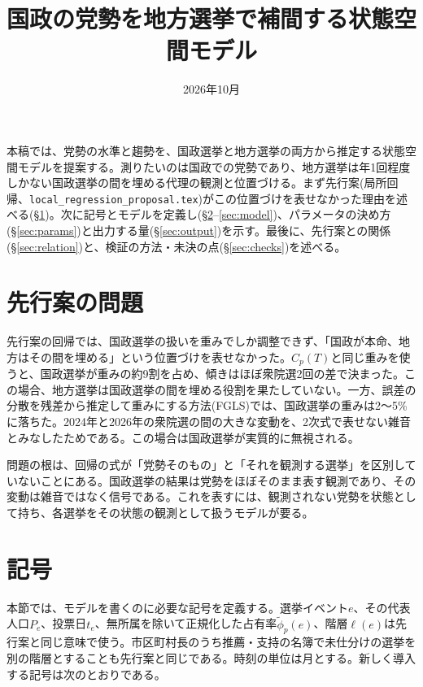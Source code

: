 \documentclass[a4paper,11pt]{ltjsarticle}
\title{国政の党勢を地方選挙で補間する状態空間モデル}
\author{}
\date{2026年10月}
\begin{document}
\maketitle

本稿では、党勢の水準と趨勢を、国政選挙と地方選挙の両方から推定する状態空間モデルを提案する。測りたいのは国政での党勢であり、地方選挙は年1回程度しかない国政選挙の間を埋める代理の観測と位置づける。まず先行案(局所回帰、\texttt{local\_regression\_proposal.tex})がこの位置づけを表せなかった理由を述べる(\S\ref{sec:motivation})。次に記号とモデルを定義し(\S\ref{sec:notation}--\ref{sec:model})、パラメータの決め方(\S\ref{sec:params})と出力する量(\S\ref{sec:output})を示す。最後に、先行案との関係(\S\ref{sec:relation})と、検証の方法・未決の点(\S\ref{sec:checks})を述べる。

\section{先行案の問題}
\label{sec:motivation}

先行案の回帰では、国政選挙の扱いを重みでしか調整できず、「国政が本命、地方はその間を埋める」という位置づけを表せなかった。$C_p(T)$と同じ重みを使うと、国政選挙が重みの約9割を占め、傾きはほぼ衆院選2回の差で決まった。この場合、地方選挙は国政選挙の間を埋める役割を果たしていない。一方、誤差の分散を残差から推定して重みにする方法(FGLS)では、国政選挙の重みは2〜5\%に落ちた。2024年と2026年の衆院選の間の大きな変動を、2次式で表せない雑音とみなしたためである。この場合は国政選挙が実質的に無視される。

問題の根は、回帰の式が「党勢そのもの」と「それを観測する選挙」を区別していないことにある。国政選挙の結果は党勢をほぼそのまま表す観測であり、その変動は雑音ではなく信号である。これを表すには、観測されない党勢を状態として持ち、各選挙をその状態の観測として扱うモデルが要る。

\section{記号}
\label{sec:notation}

本節では、モデルを書くのに必要な記号を定義する。選挙イベント$e$、その代表人口$P_e$、投票日$t_e$、無所属を除いて正規化した占有率$\tilde\phi_p(e)$、階層$\ell(e)$は先行案と同じ意味で使う。市区町村長のうち推薦・支持の名簿で未仕分けの選挙を別の階層とすることも先行案と同じである。時刻の単位は月とする。新しく導入する記号は次のとおりである。
\end{document}
